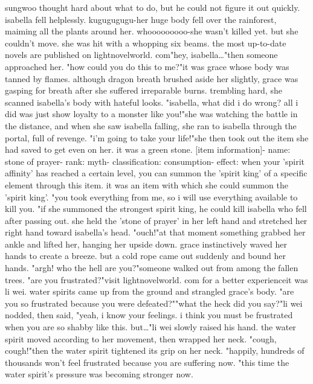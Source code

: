 sungwoo thought hard about what to do, but he could not figure it out quickly.
 isabella fell helplessly.
kugugugugu-her huge body fell over the rainforest, maiming all the plants around her.
whooooooooo-she wasn't killed yet.
 but she couldn't move.
 she was hit with a whopping six beams.
the most up-to-date novels are published on lightnovelworld.
com"hey, isabella…"then someone approached her.
"how could you do this to me?"it was grace whose body was tanned by flames.
 although dragon breath brushed aside her slightly, grace was gasping for breath after she suffered irreparable burns.
trembling hard, she scanned isabella's body with hateful looks.
 "isabella, what did i do wrong? all i did was just show loyalty to a monster like you!"she was watching the battle in the distance, and when she saw isabella falling, she ran to isabella through the portal, full of revenge.
 "i'm going to take your life!"she then took out the item she had saved to get even on her.
 it was a green stone.
[item information]- name: stone of prayer- rank: myth- classification: consumption- effect: when your 'spirit affinity' has reached a certain level, you can summon the 'spirit king' of a specific element through this item.
it was an item with which she could summon the 'spirit king'.
"you took everything from me, so i will use everything available to kill you.
"if she summoned the strongest spirit king, he could kill isabella who fell after passing out.
she held the 'stone of prayer' in her left hand and stretched her right hand toward isabella's head.
"ouch!"at that moment something grabbed her ankle and lifted her, hanging her upside down.
 grace instinctively waved her hands to create a breeze.
 but a cold rope came out suddenly and bound her hands.
"argh! who the hell are you?"someone walked out from among the fallen trees.
"are you frustrated?"visit lightnov­elworld.
c‌om for a better experienceit was li wei.
 water spirits came up from the ground and strangled grace's body.
"are you so frustrated because you were defeated?""what the heck did you say?"li wei nodded, then said, "yeah, i know your feelings.
 i think you must be frustrated when you are so shabby like this.
 but…"li wei slowly raised his hand.
 the water spirit moved according to her movement, then wrapped her neck.
"cough, cough!"then the water spirit tightened its grip on her neck.
 "happily, hundreds of thousands won't feel frustrated because you are suffering now.
"this time the water spirit's pressure was becoming stronger now.
 

